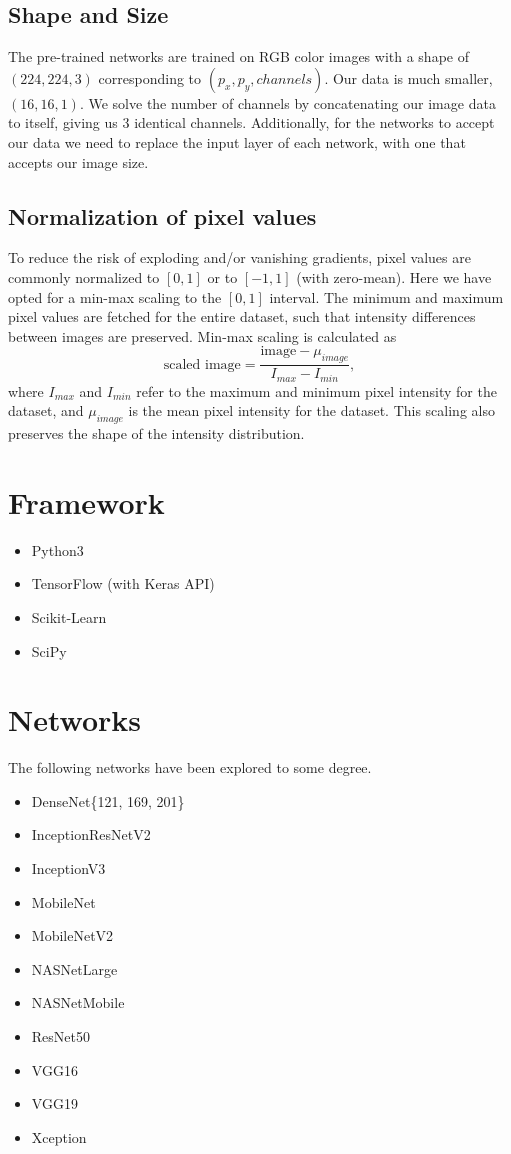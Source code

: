 \documentclass[12pt, notitlepage]{article}
\newcommand{\f}[2]{\frac{#1}{#2}}
\begin{document}
\subsection{Shape and Size}
The pre-trained networks are trained on RGB color images with a shape of $(224, 224, 3)$
corresponding to $(p_x, p_y, channels)$. Our data is much smaller, $(16, 16, 1)$. 
We solve the number of channels by concatenating our image data to itself, giving us 3 identical channels. 
Additionally, for the networks to accept our data we need to replace the input layer of each network,
with one that accepts our image size.
\subsection{Normalization of pixel values}
To reduce the risk of exploding and/or vanishing gradients, pixel values are commonly
normalized to $[0, 1]$ or to $[-1, 1]$ (with zero-mean). Here we have opted for a min-max scaling to the $[0, 1]$ interval.
The minimum and maximum pixel values are fetched for the entire dataset, such that intensity differences
between images are preserved. Min-max scaling is calculated as
\begin{equation}
    \text{scaled image} = \f{\text{image} - \mu_{image}}{I_{max} - I_{min}},
\end{equation}
where $I_{max}$ and $I_{min}$ refer to the maximum and minimum pixel intensity for the dataset,
and $\mu_{image}$ is the mean pixel intensity for the dataset. This scaling also preserves the
shape of the intensity distribution.

\section{Framework}
\begin{itemize}
    \item Python3
    \item TensorFlow (with Keras API)
    \item Scikit-Learn
    \item SciPy
\end{itemize}
\section{Networks}
The following networks have been explored to some degree.
\begin{itemize}
    \item DenseNet\{121, 169, 201\}
    \item InceptionResNetV2
    \item InceptionV3
    \item MobileNet
    \item MobileNetV2
    \item NASNetLarge
    \item NASNetMobile
    \item ResNet50
    \item VGG16
    \item VGG19
    \item Xception
\end{itemize}
\end{document}
